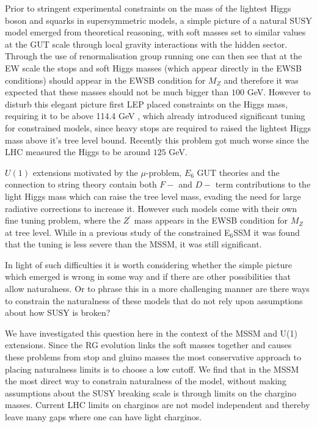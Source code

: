 \documentclass[preprint,amsmath,amssymb,aps,superscriptaddress,prd,showpacs,floatfix,nofootinbib]{revtex4-1}
\begin{document}
Prior to stringent experimental constraints on the mass of the
lightest Higgs boson and squarks in supersymmetric models, a simple
picture of a natural SUSY model emerged from theoretical reasoning,
with soft masses set to similar values at the GUT scale through local
gravity interactions with the hidden sector.  Through the use of
renormalisation group running one can then see that at the EW scale
the stops and soft Higgs masses (which appear directly in the EWSB
conditions) should appear in the EWSB condition for $M_Z$ and
therefore it was expected that these masses should not be much bigger
than $100$ GeV.  However to disturb this elegant picture first LEP
placed constraints on the Higgs mass, requiring it to be above 114.4
GeV \cite{Barate:2003sz,Schael:2006cr}, which already introduced significant tuning for
constrained models, since heavy stops are required to raised the
lightest Higgs mass above it's tree level bound. Recently this problem
got much worse since the LHC measured the Higgs to be around $125$
GeV.

$U(1)$ extensions motivated by the $\mu$-problem, $E_6$ GUT theories
and the connection to string theory contain both $F-$ and $D-$ term
contributions to the light Higgs mass which can raise the tree level
mass, evading the need for large radiative corrections to increase it.
However such models come with their own fine tuning problem, where the
$Z^\prime$ mass appears in the EWSB condition for $M_Z$ at tree level.
While in a previous study of the constrained E$_6$SSM it was found
that the tuning is less severe than the MSSM, it was still significant.

In light of such difficulties it is worth considering whether the
simple picture which emerged is wrong in some way and if there are
other possibilities that allow naturalness.  Or to phrase this in a
more challenging manner are there ways to constrain the naturalness of
these models that do not rely upon assumptions about how SUSY is
broken?

We have investigated this question here in the context of the MSSM and
U(1) extensions.  Since the RG evolution links the soft masses
together and causes these problems from stop and gluino masses the
most conservative approach to placing naturalness limits is to choose
a low cutoff. We find that in the MSSM the most direct way to
constrain naturalness of the model, without making assumptions about
the SUSY breaking scale is through limits on the chargino
masses. Current LHC limits on charginos are not model independent and
thereby leave many gaps where one can have light charginos.
\end{document}
